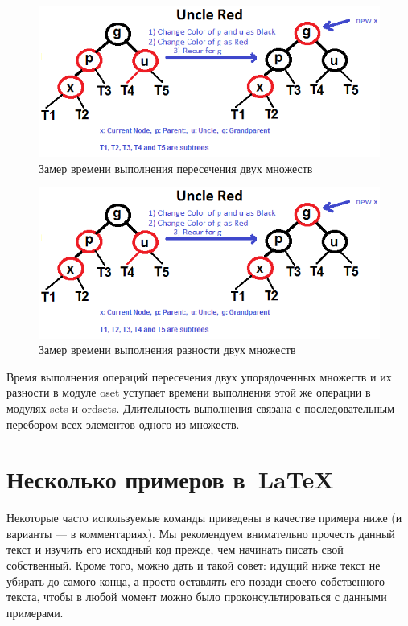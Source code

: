 		\begin{figure}[H]
				\centering
				\includegraphics[width=\textwidth]{img/tan-aus.png}
				\caption{Замер времени выполнения пересечения двух множеств}
		\end{figure}
		
		\begin{figure}[H]
				\centering
				\includegraphics[width=\textwidth]{img/tan-aus.png}
				\caption{Замер времени выполнения разности двух множеств}
		\end{figure}
		Время выполнения операций пересечения двух упорядоченных множеств и их разности в модуле oset уступает времени
		выполнения этой	же операции в модулях sets и ordsets. Длительность выполнения связана с последовательным перебором
		всех элементов одного из множеств.
		

\section{Несколько примеров в~\LaTeX{}}
\label{sec:examples}

Некоторые часто используемые
команды приведены в качестве примера ниже (и варианты — в
комментариях). Мы рекомендуем внимательно прочесть данный
текст и изучить его исходный код прежде, чем начинать писать
свой собственный. Кроме того, можно дать и такой совет: идущий
ниже текст не убирать до самого конца, а просто оставлять его
позади своего собственного текста, чтобы в любой момент можно
было проконсультироваться с данными примерами.

